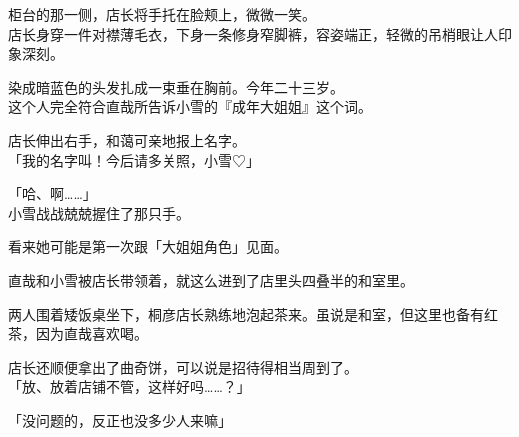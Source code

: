 柜台的那一侧，店长将手托在脸颊上，微微一笑。\\

店长身穿一件对襟薄毛衣，下身一条修身窄脚裤，容姿端正，轻微的吊梢眼让人印象深刻。

染成暗蓝色的头发扎成一束垂在胸前。今年二十三岁。\\

这个人完全符合直哉所告诉小雪的『成年大姐姐』这个词。

店长伸出右手，和蔼可亲地报上名字。\\

「我的名字叫！今后请多关照，小雪♡」

「哈、啊……」\\

小雪战战兢兢握住了那只手。

看来她可能是第一次跟「大姐姐角色」见面。\\

\vspace{2\baselineskip}

直哉和小雪被店长带领着，就这么进到了店里头四叠半的和室里。

两人围着矮饭桌坐下，桐彦店长熟练地泡起茶来。虽说是和室，但这里也备有红茶，因为直哉喜欢喝。

店长还顺便拿出了曲奇饼，可以说是招待得相当周到了。\\

「放、放着店铺不管，这样好吗……？」

「没问题的，反正也没多少人来嘛」\\

